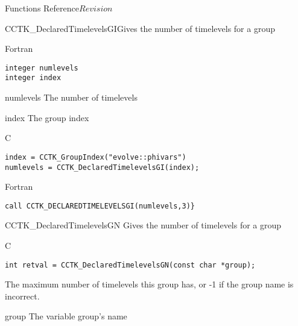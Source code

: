 \begin{cactuspart}{ Functions Reference}{}{$Revision$}
\begin{FunctionDescription}{CCTK\_DeclaredTimelevelsGI}{Gives the number of timelevels for a group}
\begin{SynopsisSection}
\begin{Synopsis}{Fortran}
\begin{verbatim}
integer numlevels
integer index\end{verbatim}
\end{Synopsis}
\end{SynopsisSection}
\begin{ParameterSection}
\begin{Parameter}{numlevels}
The number of timelevels
\end{Parameter}
\begin{Parameter}{index}
The group index
\end{Parameter}
\end{ParameterSection}

\begin{ExampleSection}
\begin{Example}{C}
\begin{verbatim}
index = CCTK_GroupIndex("evolve::phivars")
numlevels = CCTK_DeclaredTimelevelsGI(index);
\end{verbatim}
\end{Example}
\begin{Example}{Fortran}
\begin{verbatim}
call CCTK_DECLAREDTIMELEVELSGI(numlevels,3)}
\end{verbatim}
\end{Example}
\end{ExampleSection}
\end{FunctionDescription}


\begin{FunctionDescription}{CCTK\_DeclaredTimelevelsGN}
\label{CCTK-DeclaredTimelevelsGN}
Gives the number of timelevels for a group
\begin{SynopsisSection}
\begin{Synopsis}{C}
\begin{verbatim}int retval = CCTK_DeclaredTimelevelsGN(const char *group);\end{verbatim}
\end{Synopsis}
\end{SynopsisSection}

\begin{ResultSection}
\begin{Result}{}
The maximum number of timelevels this group has, or -1 if the group name is incorrect.
\end{Result}
\end{ResultSection}

\begin{ParameterSection}
\begin{Parameter}{group}
The variable group's name
\end{Parameter}
\end{ParameterSection}


\end{FunctionDescription}
\end{cactuspart}
